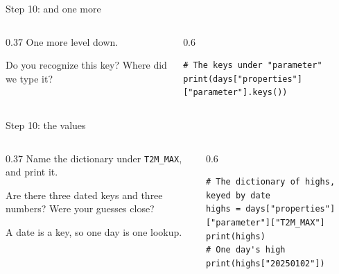 \documentclass[9pt,aspectratio=169]{beamer}
\begin{document}
\begin{frame}[fragile]{Step 10: and one more}
    \begin{columns}[T]
        \begin{column}{0.37\textwidth}
            One more level down.

            \medskip
            Do you recognize this key? Where did we type it?
        \end{column}
        \begin{column}{0.6\textwidth}
\begin{lstlisting}
# The keys under "parameter"
print(days["properties"]["parameter"].keys())
\end{lstlisting}
        \end{column}
    \end{columns}
\end{frame}

\begin{frame}[fragile]{Step 10: the values}
    \begin{columns}[T]
        \begin{column}{0.37\textwidth}
            Name the dictionary under \texttt{T2M\_MAX}, and print it.

            \medskip
            Are there three dated keys and three numbers? Were your guesses close?

            \medskip
            A date is a key, so one day is one lookup.
        \end{column}
        \begin{column}{0.6\textwidth}
\begin{lstlisting}
# The dictionary of highs, keyed by date
highs = days["properties"]["parameter"]["T2M_MAX"]
print(highs)
# One day's high
print(highs["20250102"])
\end{lstlisting}
        \end{column}
    \end{columns}
\end{frame}
\end{document}
